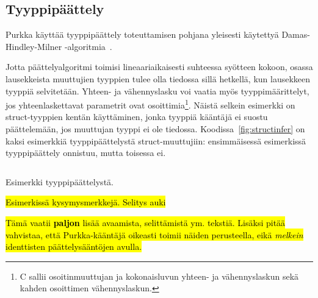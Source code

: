\subsection{Tyyppipäättely}

Purkka käyttää tyyppipäättely toteuttamisen pohjana yleisesti käytettyä
Damas-Hindley-Milner -algoritmia~\citep{hindley, milner, damas}.

Jotta päättelyalgoritmi toimisi lineaariaikaisesti suhteessa syötteen kokoon,
osassa lausekkeista muuttujien tyyppien tulee olla tiedossa sillä hetkellä, kun
lausekkeen tyyppiä selvitetään. Yhteen- ja vähennyslasku voi vaatia myös
tyyppimäärittelyt, jos yhteenlaskettavat parametrit ovat osoittimia\footnote{C
sallii osoitinmuuttujan ja kokonaisluvun yhteen- ja vähennyslaskun sekä kahden
osoittimen vähennyslaskun.}. Näistä selkein esimerkki on struct-tyyppien kentän
käyttäminen, jonka tyyppiä kääntäjä ei suostu päättelemään, jos muuttujan
tyyppi ei ole tiedossa. Koodissa~\ref{fig:structinfer} on kaksi esimerkkiä
tyyppipäättelystä struct-muuttujiin: ensimmäisessä esimerkissä
tyyppipäättely onnistuu, mutta toisessa ei.

\begin{listing}[ht!]
    \inputminted{Rust}{koodi/infer.prk}
    \caption{Esimerkki tyyppipäättelystä.}
    \label{fig:structinfer}
\end{listing}



\FloatBarrier

\hl {Esimerkissä kysymysmerkkejä. Selitys auki}

\hl{Tämä vaatii \textbf{paljon} lisää avaamista, selittämistä ym. tekstiä.
Lisäksi pitää vahvistaa, että Purkka-kääntäjä oikeasti toimii näiden
perusteella, eikä \emph{melkein} identtisten päättelysääntöjen avulla.}

\newcommand{\hmtag}[1]{\tag*{[#1]\hspace*{1cm}}}

